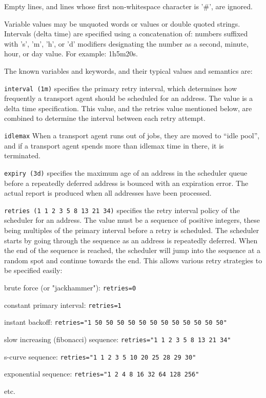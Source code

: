 Empty  lines,  and  lines   whose   first   non-whitespace
character is '\#', are ignored.

Variable values may be unquoted words or values or double 
quoted strings.  Intervals  (delta  time)  are  specified
using  a concatenation of: numbers suffixed with 's', 'm',
'h', or 'd' modifiers designating the number as a  second,
minute, hour, or day value.  For example: 1h5m20s.

The known variables and keywords, and their typical values
and semantics are:

{\tt interval (1m)}
specifies the primary retry interval, which determines how frequently a 
transport agent should be scheduled for an address. The value is a delta
time specification. This value, and the retries value mentioned below, 
are combined to determine the interval between each retry attempt.

{\tt idlemax}
When a transport agent runs out of jobs, they are moved
to ``idle pool'', and if a transport agent spends more than idlemax
time in there, it is terminated.

{\tt expiry (3d)}
specifies  the  maximum age of an address in the scheduler 
queue before  a repeatedly  deferred  address  is
bounced with an expiration error.  The actual report is
produced when all addresses have been processed.

{\tt retries (1 1 2 3 5 8 13 21 34)} 
specifies the retry interval policy  of the scheduler 
for an address. The value must be a sequence of positive integers, these 
being multiples of the primary interval  before  a  retry is scheduled. 
The scheduler starts by going through the sequence as an  address  is 
repeatedly deferred. When the end of the sequence is reached, the scheduler 
will jump into the sequence at a random  spot and continue towards the end.  
This allows various retry strategies to be specified easily:

brute force (or "jackhammer"): {\tt  retries=0 }

constant primary interval: {\tt  retries=1 }

instant backoff: {\tt  retries="1 50 50 50 50 50 50 50 50 50 50 50 50" }

slow increasing (fibonacci) sequence: {\tt  retries="1 1 2 3 5 8 13 21 34" }

s-curve sequence: {\tt  retries="1 1 2 3 5 10 20 25 28 29 30" }

exponential sequence: {\tt  retries="1 2 4 8 16 32 64 128 256" }

etc.

